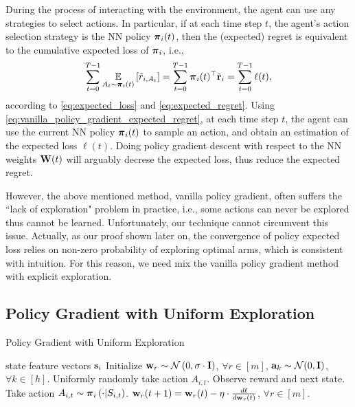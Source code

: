 During the process of interacting with the environment, the agent can use any strategies to select actions. In particular, if at each time step $t$, the agent's action selection strategy is the NN policy ${\boldsymbol{\pi}}_i(t)$, then the (expected) regret is equivalent to the cumulative expected loss of ${\boldsymbol{\pi}}_i$, i.e., 
\begin{equation}
\label{eq:vanilla_policy_gradient_expected_regret}
\begin{split}
    \sum\limits_{t=0}^{T-1}{ \operatorname*{{\mathbb{E}}}\limits_{A_t \sim {\boldsymbol{\pi}}_i(t)} \left[ \tilde{r}_{i, A_t} \right] } = \sum\limits_{t=0}^{T-1}{{\boldsymbol{\pi}}_i(t)^\top {\tilde{\mathbf{r}}}_i} = \sum\limits_{t=0}^{T-1}{\ell(t)},
\end{split}
\end{equation}
according to \cref{eq:expected_loss} and \cref{eq:expected_regret}. Using \cref{eq:vanilla_policy_gradient_expected_regret}, at each time step $t$, the agent can use the current NN policy ${\boldsymbol{\pi}}_i(t)$ to sample an action, and obtain an estimation of the expected loss $\ell(t)$. Doing policy gradient descent with respect to the NN weights ${\mathbf{W}}(t)$ will arguably decrese the expected loss, thus reduce the expected regret. 

However, the above mentioned method, vanilla policy gradient, often suffers the ``lack of exploration" problem in practice, i.e., some actions can never be explored thus cannot be learned. Unfortunately, our technique cannot circumvent this issue. Actually, as our proof shown later on, the convergence of policy expected loss relies on non-zero probability of exploring optimal arms, which is consistent with intuition. For this reason, we need mix the vanilla policy gradient method with explicit exploration.

\subsection{Policy Gradient with Uniform Exploration}

\begin{algorithm}[h]
   \caption{Policy Gradient with Uniform Exploration}
\label{alg:policy_gradient_uniform_exploration}
\begin{algorithmic}
    state feature vectors ${\mathbf{s}}_i$
   \STATE Initialize ${\mathbf{w}}_r \sim {\mathcal{N}}\left( 0, \sigma \cdot {\mathbf{I}} \right)$, $\forall r \in [m]$, ${\mathbf{a}}_k \sim {\mathcal{N}}(0, {\mathbf{I}})$, $\forall k \in [h]$.
   \STATE Uniformly randomly take action $A_{i,t}$. 
   \STATE Observe reward and next state.
   \ELSE
   \STATE Take action $A_{i,t} \sim {\boldsymbol{\pi}}_{i}\left(\cdot \middle| S_{i,t} \right)$. 
   \ENDIF
   \STATE ${\mathbf{w}}_r(t+1) = {\mathbf{w}}_r(t) - \eta \cdot \frac{d\ell}{d {\mathbf{w}}_r(t)}$, $\forall r \in [m]$.
   \ENDFOR
\end{algorithmic}
\end{algorithm}

